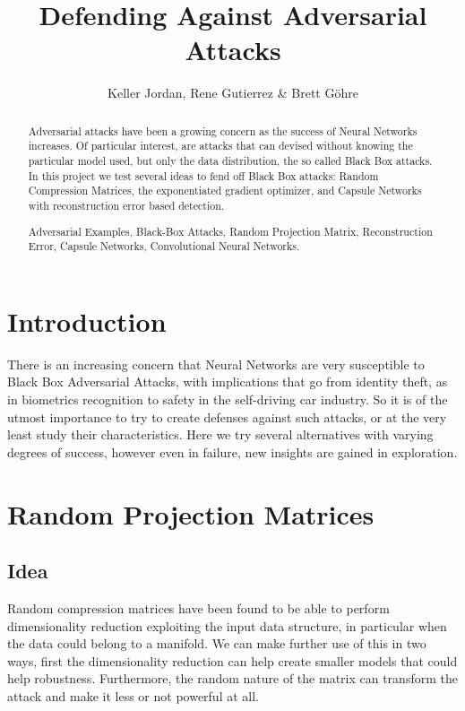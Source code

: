 \documentclass{asaproc}
\title{Defending Against Adversarial Attacks}
\author{Keller Jordan, Rene Gutierrez \& Brett G\"{o}hre \\}
\begin{document}
\maketitle


\begin{abstract}
	
Adversarial attacks have been a growing concern as the success of Neural Networks increases. Of particular interest, are attacks that can devised without knowing the particular model used, but only the data distribution, the so called Black Box attacks. In this project we test several ideas to fend off Black Box attacks: Random Compression Matrices, the exponentiated gradient optimizer, and Capsule Networks with reconstruction error based detection.
	
\begin{keywords}
Adversarial Examples, Black-Box Attacks, Random Projection Matrix, Reconstruction Error, Capsule Networks, Convolutional Neural Networks.
\end{keywords}
\end{abstract}


\section{Introduction}

There is an increasing concern that Neural Networks are very susceptible to Black Box Adversarial Attacks, with implications that go from identity theft, as in biometrics recognition to safety in the self-driving car industry. So it is of the utmost importance to try to create defenses against such attacks, or at the very least study their characteristics. Here we try several alternatives with varying degrees of success, however even in failure, new insights are gained in exploration.

\section{Random Projection Matrices}

\subsection*{Idea}

Random compression matrices have been found to be able to perform dimensionality reduction exploiting the input data structure, in particular when the data could belong to a manifold. We can make further use of this in two ways, first the dimensionality reduction can help create smaller models that could help robustness. Furthermore, the random nature of the matrix can transform the attack and make it less or not powerful at all.
\end{document}
